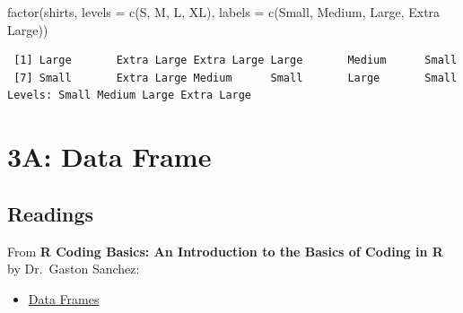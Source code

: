 \documentclass[
  letterpaper,
  DIV=11,
  numbers=noendperiod]{scrreprt}
\newenvironment{Shaded}{\begin{snugshade}}{\end{snugshade}}
\newcommand{\AttributeTok}[1]{\textcolor[rgb]{0.40,0.45,0.13}{#1}}
\newcommand{\FunctionTok}[1]{\textcolor[rgb]{0.28,0.35,0.67}{#1}}
\newcommand{\NormalTok}[1]{\textcolor[rgb]{0.00,0.23,0.31}{#1}}
\newcommand{\StringTok}[1]{\textcolor[rgb]{0.13,0.47,0.30}{#1}}
\providecommand{\tightlist}{%
  \setlength{\itemsep}{0pt}\setlength{\parskip}{0pt}}\usepackage{longtable,booktabs,array}
\begin{document}
\begin{tcolorbox}[enhanced jigsaw, colbacktitle=quarto-callout-tip-color!10!white, opacitybacktitle=0.6, breakable, left=2mm, leftrule=.75mm, toprule=.15mm, toptitle=1mm, bottomtitle=1mm, colframe=quarto-callout-tip-color-frame, opacityback=0, coltitle=black, arc=.35mm, titlerule=0mm, colback=white, bottomrule=.15mm, title=\textcolor{quarto-callout-tip-color}{\faLightbulb}\hspace{0.5em}{Answer}, rightrule=.15mm]

\begin{Shaded}
\begin{Highlighting}[]
\FunctionTok{factor}\NormalTok{(shirts, }\AttributeTok{levels =} \FunctionTok{c}\NormalTok{(}\StringTok{\textquotesingle{}S\textquotesingle{}}\NormalTok{, }\StringTok{\textquotesingle{}M\textquotesingle{}}\NormalTok{, }\StringTok{\textquotesingle{}L\textquotesingle{}}\NormalTok{, }\StringTok{\textquotesingle{}XL\textquotesingle{}}\NormalTok{),}
       \AttributeTok{labels =} \FunctionTok{c}\NormalTok{(}\StringTok{\textquotesingle{}Small\textquotesingle{}}\NormalTok{, }\StringTok{\textquotesingle{}Medium\textquotesingle{}}\NormalTok{, }\StringTok{\textquotesingle{}Large\textquotesingle{}}\NormalTok{, }\StringTok{\textquotesingle{}Extra Large\textquotesingle{}}\NormalTok{))}
\end{Highlighting}
\end{Shaded}

\begin{verbatim}
 [1] Large       Extra Large Extra Large Large       Medium      Small      
 [7] Small       Extra Large Medium      Small       Large       Small      
Levels: Small Medium Large Extra Large
\end{verbatim}

\end{tcolorbox}

\chapter{3A: Data Frame}\label{a-data-frame}

\section{Readings}\label{readings-3}

From \textbf{R Coding Basics: An Introduction to the Basics of Coding in
R} by Dr.~Gaston Sanchez:

\begin{itemize}
\tightlist
\item
  \href{https://www.gastonsanchez.com/R-coding-basics/4-02-data-frames.html}{Data
  Frames}
\end{itemize}
\end{document}
